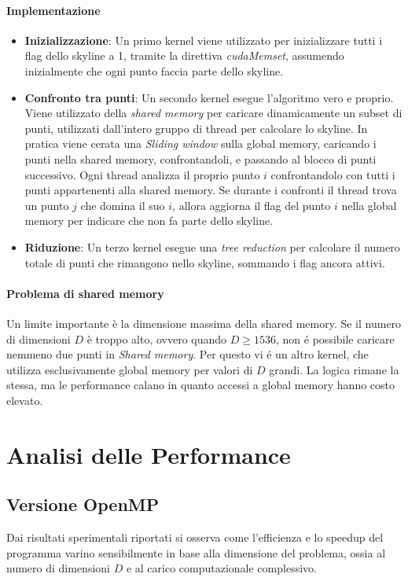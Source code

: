 \documentclass[a4paper,12pt,oneside]{article}
\begin{document}
\paragraph{Implementazione}
\begin{itemize}
\item \textbf{Inizializzazione}: Un primo kernel viene utilizzato per inizializzare tutti i flag dello skyline a 1, tramite la direttiva \textit{cudaMemset}, assumendo inizialmente che ogni  punto faccia parte dello skyline.
\item \textbf{Confronto tra punti}: Un secondo kernel esegue l'algoritmo vero e proprio. Viene utilizzato della \emph{shared memory} per caricare dinamicamente un subset di punti, utilizzati dall'intero gruppo di thread per calcolare lo skyline. In pratica viene cerata una \emph{Sliding window} sulla global memory, caricando i punti nella shared memory, confrontandoli, e passando al blocco di punti successivo. Ogni thread analizza il proprio punto $i$ confrontandolo con tutti i punti appartenenti alla shared memory. Se durante i confronti il thread trova un punto $j$ che domina il suo $i$, allora aggiorna il flag del punto $i$ nella global memory per indicare che non fa parte dello skyline.
\item \textbf{Riduzione}: Un terzo kernel esegue una \textit{tree reduction} per calcolare il numero totale di punti che rimangono nello skyline, sommando i flag ancora attivi.
\end{itemize}

\paragraph{Problema di shared memory}
Un limite importante è la dimensione massima della shared memory. Se il numero di dimensioni $D$ è troppo alto, ovvero quando $D \ge 1536$, non é possibile caricare nemmeno due punti in \emph{Shared memory}. Per questo vi é un altro kernel, che utilizza esclusivamente global memory per valori di $D$ grandi. La logica rimane la stessa, ma le performance calano in quanto accessi a global memory hanno costo elevato.

\section{Analisi delle Performance}
\subsection{Versione OpenMP}
Dai risultati sperimentali riportati si osserva come l’efficienza e lo speedup del programma varino sensibilmente in base alla dimensione del problema, ossia al numero di dimensioni $D$ e al carico computazionale complessivo.
\end{document}
